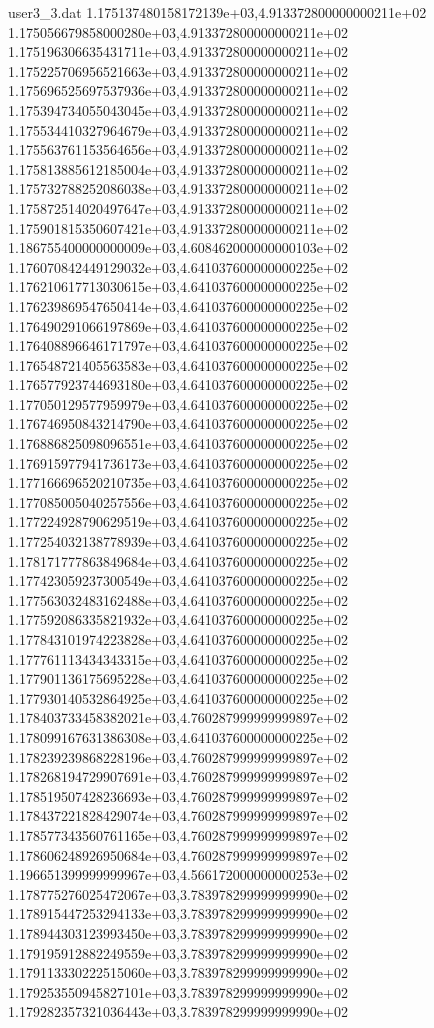 \begin{filecontents}{user3_3.dat}
1.175137480158172139e+03,4.913372800000000211e+02
1.175056679858000280e+03,4.913372800000000211e+02
1.175196306635431711e+03,4.913372800000000211e+02
1.175225706956521663e+03,4.913372800000000211e+02
1.175696525697537936e+03,4.913372800000000211e+02
1.175394734055043045e+03,4.913372800000000211e+02
1.175534410327964679e+03,4.913372800000000211e+02
1.175563761153564656e+03,4.913372800000000211e+02
1.175813885612185004e+03,4.913372800000000211e+02
1.175732788252086038e+03,4.913372800000000211e+02
1.175872514020497647e+03,4.913372800000000211e+02
1.175901815350607421e+03,4.913372800000000211e+02
1.186755400000000009e+03,4.608462000000000103e+02
1.176070842449129032e+03,4.641037600000000225e+02
1.176210617713030615e+03,4.641037600000000225e+02
1.176239869547650414e+03,4.641037600000000225e+02
1.176490291066197869e+03,4.641037600000000225e+02
1.176408896646171797e+03,4.641037600000000225e+02
1.176548721405563583e+03,4.641037600000000225e+02
1.176577923744693180e+03,4.641037600000000225e+02
1.177050129577959979e+03,4.641037600000000225e+02
1.176746950843214790e+03,4.641037600000000225e+02
1.176886825098096551e+03,4.641037600000000225e+02
1.176915977941736173e+03,4.641037600000000225e+02
1.177166696520210735e+03,4.641037600000000225e+02
1.177085005040257556e+03,4.641037600000000225e+02
1.177224928790629519e+03,4.641037600000000225e+02
1.177254032138778939e+03,4.641037600000000225e+02
1.178171777863849684e+03,4.641037600000000225e+02
1.177423059237300549e+03,4.641037600000000225e+02
1.177563032483162488e+03,4.641037600000000225e+02
1.177592086335821932e+03,4.641037600000000225e+02
1.177843101974223828e+03,4.641037600000000225e+02
1.177761113434343315e+03,4.641037600000000225e+02
1.177901136175695228e+03,4.641037600000000225e+02
1.177930140532864925e+03,4.641037600000000225e+02
1.178403733458382021e+03,4.760287999999999897e+02
1.178099167631386308e+03,4.641037600000000225e+02
1.178239239868228196e+03,4.760287999999999897e+02
1.178268194729907691e+03,4.760287999999999897e+02
1.178519507428236693e+03,4.760287999999999897e+02
1.178437221828429074e+03,4.760287999999999897e+02
1.178577343560761165e+03,4.760287999999999897e+02
1.178606248926950684e+03,4.760287999999999897e+02
1.196651399999999967e+03,4.566172000000000253e+02
1.178775276025472067e+03,3.783978299999999990e+02
1.178915447253294133e+03,3.783978299999999990e+02
1.178944303123993450e+03,3.783978299999999990e+02
1.179195912882249559e+03,3.783978299999999990e+02
1.179113330222515060e+03,3.783978299999999990e+02
1.179253550945827101e+03,3.783978299999999990e+02
1.179282357321036443e+03,3.783978299999999990e+02

\end{filecontents}
